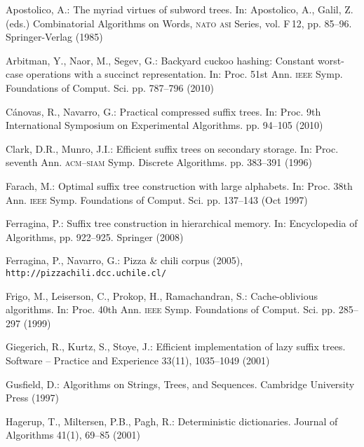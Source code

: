 \documentclass{llncs}
\let\bibtla\textsc
\begin{document}
\begin{thebibliography}{10}
\providecommand{\url}[1]{\texttt{#1}}
\providecommand{\urlprefix}{URL }

Apostolico, A.: The myriad virtues of subword trees. In: Apostolico, A., Galil,
  Z. (eds.) Combinatorial Algorithms on Words, {\bibtla{nato}} {\bibtla{asi}}
  Series, vol. F\,12, pp. 85--96. Springer-Verlag (1985)

Arbitman, Y., Naor, M., Segev, G.: Backyard cuckoo hashing: Constant worst-case
  operations with a succinct representation. In: Proc. 51st Ann.
  {\bibtla{ieee}} Symp. Foundations of {Comput. Sci.} pp. 787--796 (2010)

C{\'a}novas, R., Navarro, G.: Practical compressed suffix trees. In: Proc. 9th
  International Symposium on Experimental Algorithms. pp. 94--105 (2010)

Clark, D.R., Munro, J.I.: Efficient suffix trees on secondary storage. In:
  Proc. seventh Ann. {\bibtla{acm}}--{\bibtla{siam}} Symp. Discrete Algorithms.
  pp. 383--391 (1996)

Farach, M.: Optimal suffix tree construction with large alphabets. In: Proc.
  38th Ann. {\bibtla{ieee}} Symp. Foundations of {Comput. Sci.} pp. 137--143
  (Oct 1997)

Ferragina, P.: Suffix tree construction in hierarchical memory. In:
  Encyclopedia of Algorithms, pp. 922--925. Springer (2008)

Ferragina, P., Navarro, G.: Pizza \& chili corpus (2005),
  \url{http://pizzachili.dcc.uchile.cl/}

Frigo, M., Leiserson, C., Prokop, H., Ramachandran, S.: Cache-oblivious
  algorithms. In: Proc. 40th Ann. {\bibtla{ieee}} Symp. Foundations of {Comput.
  Sci.} pp. 285--297 (1999)

Giegerich, R., Kurtz, S., Stoye, J.: Efficient implementation of lazy suffix
  trees. Software -- Practice and Experience  33(11),  1035--1049 (2001)

Gusfield, D.: Algorithms on Strings, Trees, and Sequences. Cambridge University
  Press (1997)

Hagerup, T., Miltersen, P.B., Pagh, R.: Deterministic dictionaries. Journal of
  Algorithms  41(1),  69--85 (2001)


\end{thebibliography}
\end{document}
